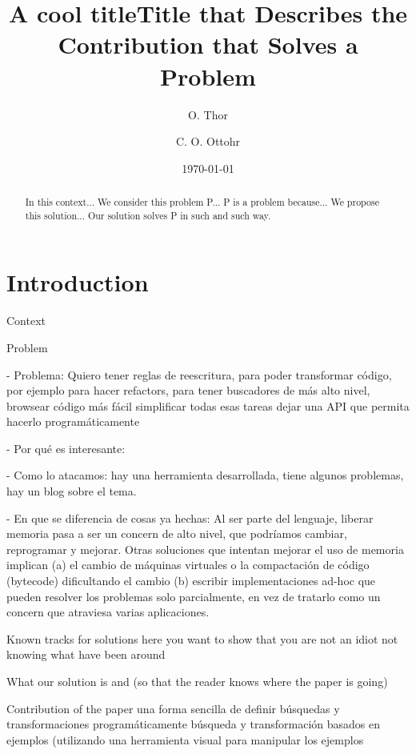 \documentclass{article}
\begin{document}
\title{A cool title}
\maketitle


\title{Title that Describes the Contribution that Solves a Problem}
\author{O. Thor \and C. O. Ottohr}
\date{\today}
\maketitle

\begin{abstract}
In this context...
We consider this problem P...
P is a problem because...
We propose this solution...
Our solution solves P in such and such way.
\end{abstract}


\section{Introduction}
\label{sec:intro}

Context

Problem

- Problema: 
Quiero tener reglas de reescritura, para poder transformar código, 
por ejemplo para hacer refactors, para tener buscadores de más alto nivel, browsear código más fácil
simplificar todas esas tareas
dejar una API que permita hacerlo programáticamente

- Por qué es interesante: 

- Como lo atacamos: 
hay una herramienta desarrollada, tiene algunos problemas, hay un blog sobre el tema.

- En que se diferencia de cosas ya hechas: Al ser parte del lenguaje, liberar memoria pasa a ser un concern de alto nivel, que podríamos cambiar, reprogramar y mejorar. Otras soluciones que intentan mejorar el uso de memoria implican (a) el cambio de máquinas virtuales o la compactación de código (bytecode) dificultando el cambio (b) escribir implementaciones ad-hoc que pueden resolver los problemas solo parcialmente, en vez de tratarlo como un concern que atraviesa varias aplicaciones.


Known tracks for solutions
	here you want to show that you are not an idiot not knowing what have been around

What our solution is  and  (so that the reader knows where the paper is going)

Contribution of the paper
una forma sencilla de definir búsquedas y transformaciones programáticamente
búsqueda y transformación basados en ejemplos (utilizando una herramienta visual para manipular los ejemplos
\end{document}

